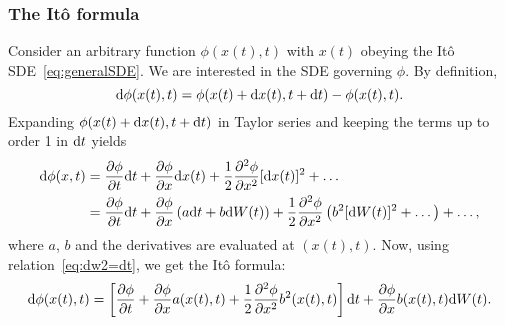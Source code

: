 \subsubsection{The Itô formula}
Consider an arbitrary function $\phi(x(t),t)$ with $x(t)$ obeying the Itô SDE~\eqref{eq:generalSDE}. We are interested in the SDE governing $\phi$. By definition, 
\begin{equation}
	\rm d\phi(x(t),t) = \phi(x(t)+\rm dx(t),t+ \rm dt) - \phi(x(t),t). 	
\end{equation}
Expanding $\phi(x(t)+\rm dx(t),t+ \rm dt)$ in Taylor series and keeping the terms up to order 1 in $\rm dt$ yields
\begin{align}
\rm d\phi(x,t) &= \frac{\partial \phi}{\partial t}\rm dt + \frac{\partial \phi}{\partial x}\rm dx(t) + \frac{1}{2} \frac{\partial^2 \phi}{\partial x^2} [\rm dx(t)]^2 + \dots \nonumber\\
&= \frac{\partial \phi}{\partial t}\rm dt + \frac{\partial \phi}{\partial x}\left(a \rm dt + b \rm dW(t)\right) + \frac{1}{2} \frac{\partial^2 \phi}{\partial x^2} \left(b^2 [\rm dW(t)]^2 + \dots \right) + \dots, \nonumber
\end{align}
where $a$, $b$ and the derivatives are evaluated at $(x(t),t)$. Now, using relation~\eqref{eq:dw2=dt}, we get the Itô formula:
\begin{equation} \label{eq:ItoFormula}
	\rm d\phi(x(t),t) = \left[\frac{\partial \phi}{\partial t} + \frac{\partial \phi}{\partial x} a(x(t),t) + \frac{1}{2}\frac{\partial^2 \phi}{\partial x^2} b^2(x(t),t)\right] \rm dt + \frac{\partial \phi}{\partial x}b(x(t),t) \rm dW(t).
\end{equation}

